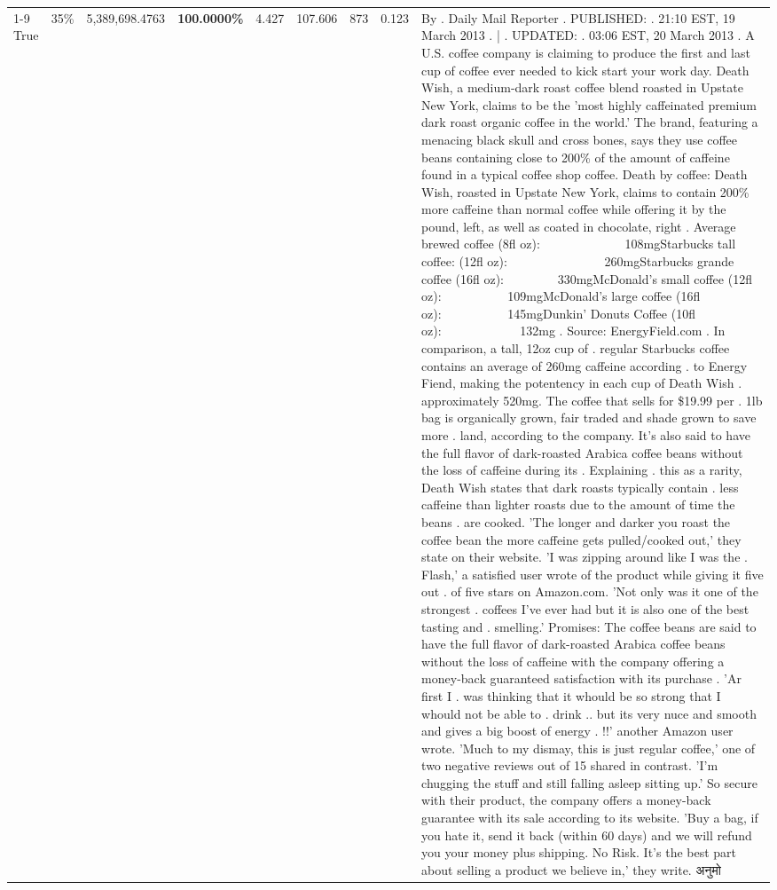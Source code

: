 \begin{table}[H]
{\begin{tabular}{lllrlllll}
\cline{1-9} \cline{2-9}
True & 35\% & 5,389,698.4763 & \bfseries \color{red} 100.0000\% & 4.427 & 107.606 & 873 & 0.123 & By . Daily Mail Reporter . PUBLISHED: . 21:10 EST, 19 March 2013 . | . UPDATED: . 03:06 EST, 20 March 2013 . A U.S. coffee company is claiming to produce the first and last cup of coffee ever needed to kick start your work day. Death Wish, a medium-dark roast coffee blend roasted in Upstate New York, claims to be the 'most highly caffeinated premium dark roast organic coffee in the world.' The brand, featuring a menacing black skull and cross bones, says they use coffee beans containing close to 200\% of the amount of caffeine found in a typical coffee shop coffee. Death by coffee: Death Wish, roasted in Upstate New York, claims to contain 200\% more caffeine than normal coffee while offering it by the pound, left, as well as coated in chocolate, right . Average brewed coffee (8fl oz):              108mgStarbucks tall coffee: (12fl oz):                260mgStarbucks grande coffee (16fl oz):         330mgMcDonald's small coffee (12fl oz):           109mgMcDonald's large coffee (16fl oz):           145mgDunkin' Donuts Coffee (10fl oz):             132mg . Source: EnergyField.com . In comparison, a tall, 12oz cup of . regular Starbucks coffee contains an average of 260mg caffeine according . to Energy Fiend, making the potentency in each cup of Death Wish . approximately 520mg. The coffee that sells for \$19.99 per . 1lb bag is organically grown, fair traded and shade grown to save more . land, according to the company. It's also said to have the full flavor of dark-roasted Arabica coffee beans without the loss of caffeine during its . Explaining . this as a rarity, Death Wish states that dark roasts typically contain . less caffeine than lighter roasts due to the amount of time the beans . are cooked. 'The longer and darker you roast the coffee bean the more caffeine gets pulled/cooked out,' they state on their website. 'I was zipping around like I was the . Flash,' a satisfied user wrote of the product while giving it five out . of five stars on Amazon.com. 'Not only was it one of the strongest . coffees I've ever had but it is also one of the best tasting and . smelling.’ Promises: The coffee beans are said to have the full flavor of dark-roasted Arabica coffee beans without the loss of caffeine with the company offering a money-back guaranteed satisfaction with its purchase . 'Ar first I . was thinking that it whould be so strong that I whould not be able to . drink .. but its very nuce and smooth and gives a big boost of energy . !!' another Amazon user wrote. 'Much to my dismay, this is just regular coffee,' one of two negative reviews out of 15 shared in contrast. 'I'm chugging the stuff and still falling asleep sitting up.' So secure with their product, the company offers a money-back guarantee with its sale according to its website. 'Buy a bag, if you hate it, send it back (within 60 days) and we will refund you your money plus shipping. No Risk. It’s the best part about selling a product we believe in,' they write. अनुमो \\

\end{tabular}}
\end{table}
